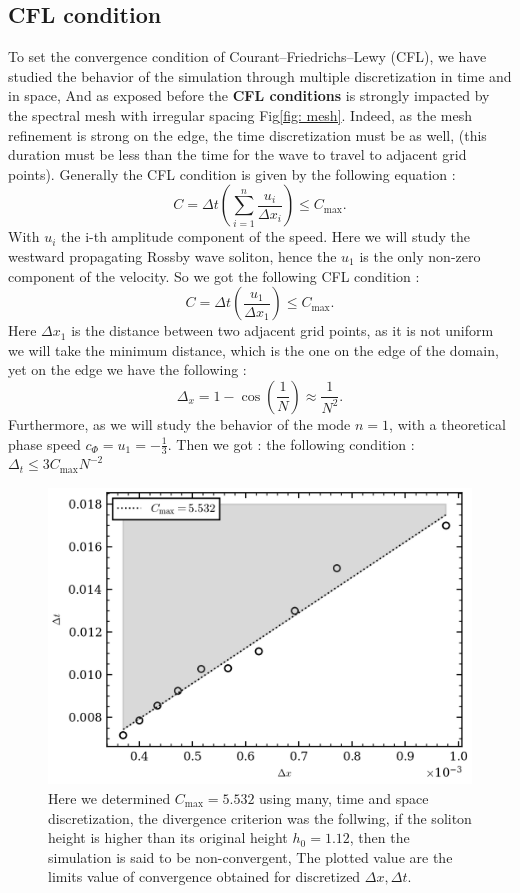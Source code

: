 \documentclass[11pt,a4paper]{report}
\begin{document}
\begin{multicols}{2}
    \subsection{CFL condition}
    To set the convergence condition of Courant–Friedrichs–Lewy (CFL), we have studied the behavior of the simulation through multiple discretization in time and in space,
    And as exposed before the \textbf{CFL conditions} is strongly impacted by the spectral mesh with irregular spacing Fig\ref{fig: mesh}. Indeed, as the mesh refinement is strong on the edge, the time discretization must be as well, (this duration must be less than the time for the wave to travel to adjacent grid points).
    Generally the CFL condition is given by the following equation :
    $$C=\Delta t\left(\sum _{i=1}^{n}{\frac {u_{i}}{\Delta x_{i}}}\right)\leq C_{\max}.$$
    With $u_i$ the i-th amplitude component of the speed. Here we will study the westward propagating Rossby wave soliton, hence the $u_1$ is the only non-zero component of the velocity.
    So we got the following CFL condition :
    $$C=\Delta t\left(\frac {u_{1}}{\Delta x_{1}}\right)\leq C_{\max }.$$
    Here $\Delta x_1$ is the distance between two adjacent grid points, as it is not uniform we will take the minimum distance, which is the one on the edge of the domain, yet on the edge we have the following :
    $$\Delta_x = 1 - \cos(\frac{1}{N}) \approx \frac{1}{N^2}.$$
    Furthermore, as we will study the behavior of the mode $n=1$, with a theoretical phase speed $c_\Phi = u_1 = -\frac{1}{3}$. Then we got :
    the following condition : $\Delta_t \le 3C_{\max} N^{-2}$
    \begin{figure}[H]
        \centering
        \includegraphics[width=1\linewidth]{./figure/dt_dx.png}
        \caption{Here we determined $C_{\max} = 5.532$ using many, time and space discretization, the divergence criterion was the follwing, if the soliton height is higher than its original height $h_0 = 1.12$, then the simulation is said to be non-convergent,
            The plotted value are the limits value of convergence obtained for discretized $\Delta x, \Delta t$.}
        \label{fig:CFL}
    \end{figure}

\end{multicols}
\end{document}
